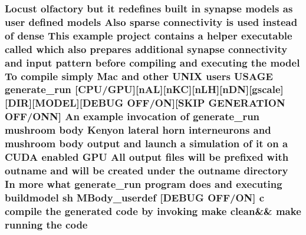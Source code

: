 \hypertarget{userproject_2MBody__userdef__project_2README_8txt_aeec4e596748e7c29dd5548dae4c70685}{
\subsubsection[{code}]{\setlength{\rightskip}{0pt plus 5cm}Locust olfactory but {\bf it} redefines built {\bf in} synapse models as user defined models Also sparse connectivity {\bf is} used instead of dense This example {\bf project} contains a helper executable called which also prepares additional synapse connectivity and input pattern before compiling and executing the {\bf model} To compile simply Mac and other U\+N\+I\+X users U\+S\+A\+G\+E {\bf generate\+\_\+run} \mbox{[}{\bf C\+P\+U}/{\bf G\+P\+U}\mbox{]}\mbox{[}n\+A\+L\mbox{]}\mbox{[}n\+K\+C\mbox{]}\mbox{[}n\+L\+H\mbox{]}\mbox{[}n\+D\+N\mbox{]}\mbox{[}gscale\mbox{]}\mbox{[}D\+I\+R\mbox{]}\mbox{[}M\+O\+D\+E\+L\mbox{]}\mbox{[}D\+E\+B\+U\+G O\+F\+F/O\+N\mbox{]}\mbox{[}S\+K\+I\+P G\+E\+N\+E\+R\+A\+T\+I\+O\+N O\+F\+F/O\+N\+N\mbox{]} An example invocation of {\bf generate\+\_\+run} mushroom body Kenyon lateral horn {\bf interneurons} and mushroom body output and launch a simulation of {\bf it} on a C\+U\+D\+A enabled {\bf G\+P\+U} All output files will be prefixed {\bf with} outname and will be created under the outname {\bf directory} In more what {\bf generate\+\_\+run} program does and executing buildmodel sh M\+Body\+\_\+userdef \mbox{[}D\+E\+B\+U\+G O\+F\+F/O\+N\mbox{]} c compile the generated code by invoking make clean\&\& make running the code}}\label{userproject_2MBody__userdef__project_2README_8txt_aeec4e596748e7c29dd5548dae4c70685}

